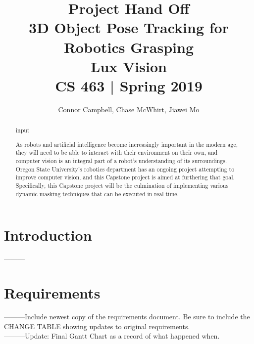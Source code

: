 \documentclass[10pt,journal,compsoc, draftclsnofoot,onecolumn]{IEEEtran}
\begin{document}
\title{Project Hand Off
    \\3D Object Pose Tracking for Robotics Grasping
    \\Lux Vision
    \\CS 463 | Spring 2019}
\author{Connor Campbell, Chase McWhirt, Jiawei Mo}

\maketitle

\begin{abstract}
input
\end{abstract}

\IEEEdisplaynontitleabstractindextext
\IEEEpeerreviewmaketitle

\newpage
\pagebreak
\tableofcontents
\pagebreak

\section{Introduction}
---------

\newpage
\section{Requirements}
---------Include newest copy of the requirements document. Be sure to include the CHANGE TABLE showing updates to original requirements. \\
---------Update: Final Gantt Chart as a record of what happened when.

\begin{abstract}
As robots and artificial intelligence become increasingly important in the modern age, they will need to be able to interact with their environment on their own, and computer vision is an integral part of a robot's understanding of its surroundings.
Oregon State University's robotics department has an ongoing project attempting to improve computer vision, and this Capstone project is aimed at furthering that goal.
Specifically, this Capstone project will be the culmination of implementing various dynamic masking techniques that can be executed in real time.
\end{abstract}
\end{document}
